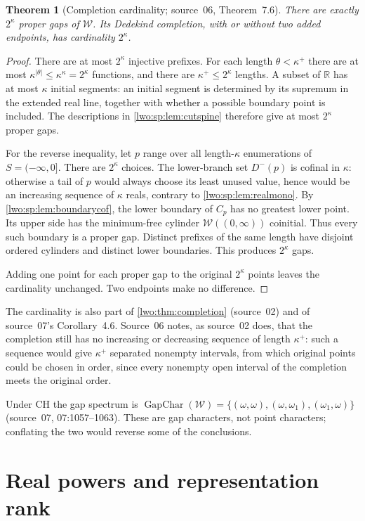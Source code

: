 \documentclass[11pt,a4paper]{article}
\newtheorem{theorem}{Theorem}[section]
\theoremstyle{definition}
\theoremstyle{remark}
\newcommand{\R}{\mathbb R}
\newcommand{\W}{\mathcal W}
\newcommand{\GapChar}{\operatorname{GapChar}}
\begin{document}
\begin{theorem}[Completion cardinality; source~06, Theorem~7.6]\label{lwo:sp:thm:gapcount}
There are exactly $2^\kappa$ proper gaps of $\W$. Its Dedekind completion, with
or without two added endpoints, has cardinality $2^\kappa$.
\end{theorem}
\begin{proof}
There are at most $2^\kappa$ injective prefixes. For each length
$\theta<\kappa^+$ there are at most $\kappa^{|\theta|}\leq\kappa^\kappa=2^\kappa$
functions, and there are $\kappa^+\leq2^\kappa$ lengths. A subset of $\R$ has
at most $\kappa$ initial segments: an initial segment is determined by its
supremum in the extended real line, together with whether a possible boundary
point is included. The descriptions in \cref{lwo:sp:lem:cutspine} therefore
give at most $2^\kappa$ proper gaps.

For the reverse inequality, let $p$ range over all length-$\kappa$
enumerations of $S=(-\infty,0]$. There are $2^\kappa$ choices. The
lower-branch set $D^-(p)$ is cofinal in $\kappa$: otherwise a tail of $p$
would always choose its least unused value, hence would be an increasing
sequence of $\kappa$ reals, contrary to \cref{lwo:sp:lem:realmono}. By
\cref{lwo:sp:lem:boundarycof}, the lower boundary of $C_p$ has no greatest
lower point. Its upper side has the minimum-free cylinder $\W((0,\infty))$
coinitial. Thus every such boundary is a proper gap. Distinct prefixes of the
same length have disjoint ordered cylinders and distinct lower boundaries.
This produces $2^\kappa$ gaps.

Adding one point for each proper gap to the original $2^\kappa$ points leaves
the cardinality unchanged. Two endpoints make no difference.
\end{proof}
The cardinality is also part of \cref{lwo:thm:completion} (source~02) and of
source~07's Corollary~4.6. Source~06 notes, as source~02 does, that the
completion still has no increasing or decreasing sequence of length $\kappa^+$:
such a sequence would give $\kappa^+$ separated nonempty intervals, from which
original points could be chosen in order, since every nonempty open interval
of the completion meets the original order.

Under CH the gap spectrum is
$\GapChar(\W)=\{(\omega,\omega),(\omega,\omega_1),(\omega_1,\omega)\}$
(source~07, 07:1057--1063). These are gap characters, not point characters;
conflating the two would reverse some of the conclusions.

\section{Real powers and representation rank}\label{lwo:rk:sec:rank}
\end{document}
